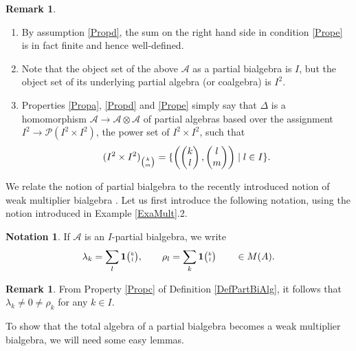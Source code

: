 \documentclass[11pt]{article}
\newcommand{\Grt}[3]{#1{\tiny {\begin{pmatrix} #2\\#3\end{pmatrix}}}}
\newcommand{\UnitC}[2]{\Grt{\mathbf{1}}{#1}{#2}}
\theoremstyle{definition}
\newtheorem{Rem}[Theorem]{Remark}
\newtheorem{Not}[Theorem]{Notation}
\numberwithin{equation}{section}
\begin{document}
\begin{Rem}\begin{enumerate}
\item By assumption \ref{Propd}, the sum on the right hand side in condition \ref{Prope} is in fact finite and hence well-defined. 
\item Note that the object set of the above $\mathscr{A}$ as a partial bialgebra is $I$, but the object set of its underlying partial algebra (or coalgebra) is $I^2$.
\item Properties \ref{Propa}, \ref{Propd} and \ref{Prope} simply say that $\Delta$ is a homomorphism $\mathscr{A}\rightarrow \mathscr{A}\otimes \mathscr{A}$ of partial algebras based over the assignment $I^2\rightarrow \mathscr{P}(I^2\times I^2)$, the power set of $I^2\times I^2$, such that \[(I^2\times I^2)_{{\tiny \begin{pmatrix} k\\m \end{pmatrix}}} = \{\left(\begin{pmatrix} k \\ l \end{pmatrix},\begin{pmatrix} l \\ m \end{pmatrix}\right)\mid l\in I\}.\] 
\end{enumerate}
\end{Rem}

We relate the notion of partial bialgebra to the recently introduced notion of weak multiplier bialgebra \cite{Boh1}. Let us first introduce the following notation, using the notion introduced in Example \ref{ExaMult}.2.

\begin{Not}
If $\mathscr{A}$ is an $I$-partial bialgebra, we write \[\lambda_k = \sum_l \UnitC{k}{l},\qquad \rho_l = \sum_k\UnitC{k}{l} \qquad \in M(A).\]
\end{Not}

\begin{Rem} From Property \ref{Propc} of Definition \ref{DefPartBiAlg}, it follows that $\lambda_k\neq 0\neq \rho_k$ for any $k\in I$. 
\end{Rem} 

To show that the total algebra of a partial bialgebra becomes a weak multiplier bialgebra, we will need some easy lemmas. 
\end{document}

